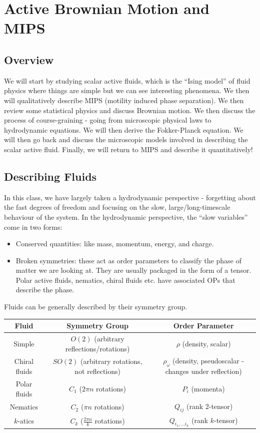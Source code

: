 \section{Active Brownian Motion and MIPS}

\subsection{Overview}
We will start by studying scalar active fluids, which is the ``Ising model'' of fluid physics where things are simple but we can see interesting phenomena. We then will qualitatively describe MIPS (motility induced phase separation). We then review some statistical physics and discuss Brownian motion. We then discuss the process of course-graining - going from microscopic physical laws to hydrodynamic equations. We will then derive the Fokker-Planck equation. We will then go back and discuss the microscopic models involved in describing the scalar active fluid. Finally, we will return to MIPS and describe it quantitatively!

\subsection{Describing Fluids}
In this class, we have largely taken a hydrodynamic perspective - forgetting about the fast degrees of freedom and focusing on the slow, large/long-timescale behaviour of the system. In the hydrodynamic perspective, the ``slow variables'' come in two forms:
\begin{itemize}
    \item Conserved quantities: like mass, momentum, energy, and charge.
    \item Broken symmetries: these act as order parameters to classify the phase of matter we are looking at. They are usually packaged in the form of a tensor. Polar active fluids, nematics, chiral fluids etc. have associated OPs that describe the phase.
\end{itemize}

Fluids can be generally described by their symmetry group.

\begin{table}[htbp]
    \centering
    \begin{tabular}{|c|c|c|}
        \hline Fluid & Symmetry Group & Order Parameter
        \\ \hline Simple & $O(2)$ (arbitrary reflections/rotations) & $\rho$ (density, scalar)
        \\ Chiral fluids & $SO(2)$ (arbitrary rotations, not reflections) & $\rho_\omega$ (density, pseudoscalar - changes under reflection)
        \\ Polar fluids & $C_1$ ($2\pi n$ rotations) & $P_i$ (momenta)
        \\ Nematics & $C_2$ ($\pi n$ rotations) & $Q_{ij}$ (rank 2-tensor)
        \\ $k$-atics  & $C_k$ ($\frac{2\pi n}{k}$ rotations) & $Q_{i_1, \ldots i_k}$ (rank $k$-tensor)
        \\ \hline
    \end{tabular}
\end{table}

